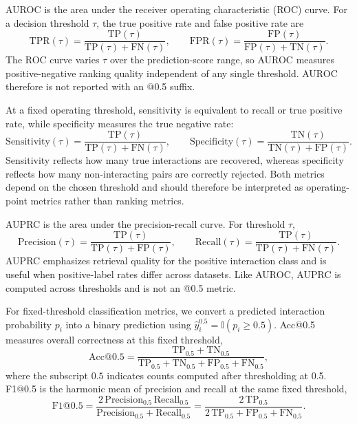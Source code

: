 AUROC is the area under the receiver operating characteristic (ROC) curve. For a decision threshold $\tau$, the true positive rate and false positive rate are
\begin{equation}
\mathrm{TPR}(\tau)=\frac{\mathrm{TP}(\tau)}{\mathrm{TP}(\tau)+\mathrm{FN}(\tau)}, \qquad
\mathrm{FPR}(\tau)=\frac{\mathrm{FP}(\tau)}{\mathrm{FP}(\tau)+\mathrm{TN}(\tau)}.
\end{equation}
The ROC curve varies $\tau$ over the prediction-score range, so AUROC measures positive-negative ranking quality independent of any single threshold. AUROC therefore is not reported with an @0.5 suffix.

At a fixed operating threshold, sensitivity is equivalent to recall or true
positive rate, while specificity measures the true negative rate:
\begin{equation}
\mathrm{Sensitivity}(\tau)=\frac{\mathrm{TP}(\tau)}{\mathrm{TP}(\tau)+\mathrm{FN}(\tau)}, \qquad
\mathrm{Specificity}(\tau)=\frac{\mathrm{TN}(\tau)}{\mathrm{TN}(\tau)+\mathrm{FP}(\tau)}.
\end{equation}
Sensitivity reflects how many true interactions are recovered, whereas
specificity reflects how many non-interacting pairs are correctly rejected.
Both metrics depend on the chosen threshold and should therefore be interpreted
as operating-point metrics rather than ranking metrics.

AUPRC is the area under the precision-recall curve. For threshold $\tau$,
\begin{equation}
\mathrm{Precision}(\tau)=\frac{\mathrm{TP}(\tau)}{\mathrm{TP}(\tau)+\mathrm{FP}(\tau)}, \qquad
\mathrm{Recall}(\tau)=\frac{\mathrm{TP}(\tau)}{\mathrm{TP}(\tau)+\mathrm{FN}(\tau)}.
\end{equation}
AUPRC emphasizes retrieval quality for the positive interaction class and is useful when positive-label rates differ across datasets. Like AUROC, AUPRC is computed across thresholds and is not an @0.5 metric.

For fixed-threshold classification metrics, we convert a predicted interaction probability $p_i$ into a binary prediction using $\hat{y}^{0.5}_i=\mathbb{I}(p_i\geq0.5)$. Acc@0.5 measures overall correctness at this fixed threshold,
\begin{equation}
\mathrm{Acc@0.5}=\frac{\mathrm{TP}_{0.5}+\mathrm{TN}_{0.5}}
{\mathrm{TP}_{0.5}+\mathrm{TN}_{0.5}+\mathrm{FP}_{0.5}+\mathrm{FN}_{0.5}},
\end{equation}
where the subscript $0.5$ indicates counts computed after thresholding at 0.5. F1@0.5 is the harmonic mean of precision and recall at the same fixed threshold,
\begin{equation}
\mathrm{F1@0.5}=
\frac{2\,\mathrm{Precision}_{0.5}\,\mathrm{Recall}_{0.5}}
{\mathrm{Precision}_{0.5}+\mathrm{Recall}_{0.5}}
=
\frac{2\,\mathrm{TP}_{0.5}}
{2\,\mathrm{TP}_{0.5}+\mathrm{FP}_{0.5}+\mathrm{FN}_{0.5}}.
\end{equation}

